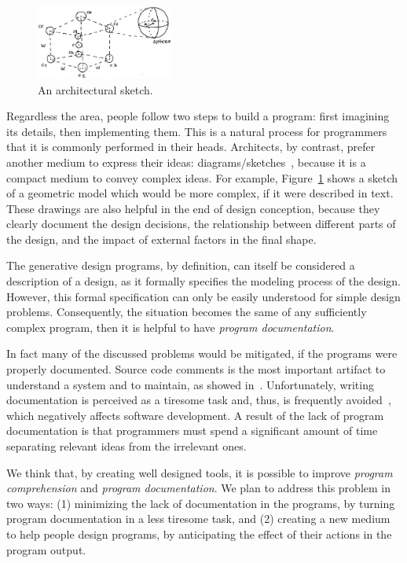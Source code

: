 \begin{figure}
  \vspace{-20pt}
  \begin{center}
    \includegraphics[width=0.4\textwidth]{img/cube-sketch}
  \end{center}
  \vspace{-15pt}
 \caption{An architectural sketch.}  
  \vspace{-20pt}
    \label{fig:sketch}
\end{figure}

Regardless the area, people follow two steps to build a program: first imagining its details, then implementing them. This is a natural process for programmers that it is commonly performed in their heads. Architects, by contrast, prefer another medium to express their ideas: diagrams/sketches~\cite{do2001thinking}, because it is a compact medium to convey complex ideas. For example, Figure~\ref{fig:sketch} shows a sketch of a geometric model which would be more complex, if it were described in text. These drawings are also helpful in the end of design conception, because they clearly document the design decisions, the relationship between different parts of the design, and the impact of external factors in the final shape.

The generative design programs, by definition, can itself be considered a description of a design, as it formally specifies the modeling process of the design. However, this formal specification can only be easily understood for simple design problems. Consequently, the situation becomes the same of any sufficiently complex program, then it is helpful to have \textit{program documentation}.

In fact many of the discussed problems would be mitigated, if the programs were properly documented. Source code comments is the most important artifact to understand a system and to maintain, as showed in~\cite{de2005study}. Unfortunately, writing documentation is perceived as a tiresome task and, thus, is frequently avoided~\cite{sousa1998survey}, which negatively affects software development. A result of the lack of program documentation is that programmers must spend a significant amount of time separating relevant ideas from the irrelevant ones.

We think that, by creating well designed tools, it is possible to improve \textit{program comprehension} and \textit{program documentation}. We plan to address this problem in two ways: (1) minimizing the lack of documentation in the programs, by turning program documentation in a less tiresome task, and (2) creating a new medium to help people design programs, by anticipating the effect of their actions in the program output.